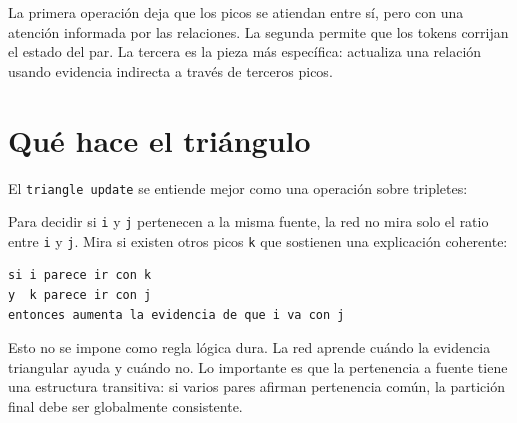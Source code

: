\documentclass[11pt]{article}
\begin{document}
La primera operación deja que los picos se atiendan entre sí, pero con una atención informada por las relaciones. La segunda permite que los tokens corrijan el estado del par. La tercera es la pieza más específica: actualiza una relación usando evidencia indirecta a través de terceros picos.

\section{Qué hace el triángulo}

El \texttt{triangle update} se entiende mejor como una operación sobre tripletes:

\begin{figure}[H]
\centering
{}
\end{figure}

Para decidir si \texttt{i} y \texttt{j} pertenecen a la misma fuente, la red no mira solo el ratio entre \texttt{i} y \texttt{j}. Mira si existen otros picos \texttt{k} que sostienen una explicación coherente:

\begin{codebox}
\begin{verbatim}
si i parece ir con k
y  k parece ir con j
entonces aumenta la evidencia de que i va con j
\end{verbatim}
\end{codebox}

\smallskip
Esto no se impone como regla lógica dura. La red aprende cuándo la evidencia triangular ayuda y cuándo no. Lo importante es que la pertenencia a fuente tiene una estructura transitiva: si varios pares afirman pertenencia común, la partición final debe ser globalmente consistente.
\end{document}
